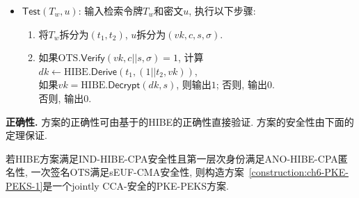 \begin{construction}
\begin{itemize}
	\item $\mathsf{Test}(T_w, u)$: 输入检索令牌$T_w$和密文$u$, 执行以下步骤:
		\begin{enumerate} \itemsep 1pt \parskip 0pt \parsep 0pt
			\item 将$T_w$拆分为$(t_1, t_2)$, $u$拆分为$(vk, c, s, \sigma)$.
			\item 如果$\text{OTS}.\mathsf{Verify}(vk, c||s, \sigma) = 1$, 计算$dk \leftarrow \text{HIBE}.\mathsf{Derive}(t_1, (1||t_2, vk))$,\\
				\hspace*{2em}如果$vk = \text{HIBE}.\mathsf{Decrypt}(dk, s)$, 则输出$1$; 否则, 输出$0$.\\
			    否则, 输出$0$.
		\end{enumerate}
\end{itemize}
\end{construction}

\begin{trivlist}
\item \textbf{正确性.} 方案的正确性可由基于的HIBE的正确性直接验证. 方案的安全性由下面的定理保证.
\end{trivlist}


\begin{theorem}\label{theorem:ch6-PKE-PEKS-1}
若HIBE方案满足IND-HIBE-CPA安全性且第一层次身份满足ANO-HIBE-CPA匿名性, 一次签名OTS满足sEUF-CMA安全性, 则构造方案~\ref{construction:ch6-PKE-PEKS-1}是一个jointly CCA-安全的PKE-PEKS方案.
\end{theorem}


